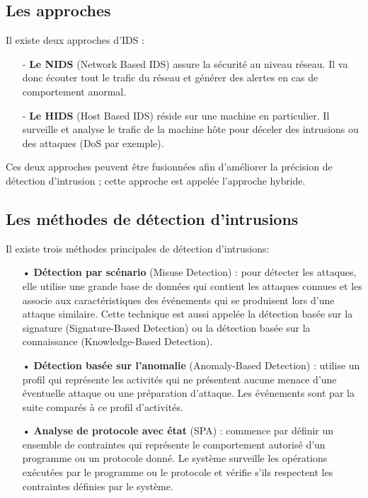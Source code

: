 \subsection{Les approches}
\label{approchesIDS}
Il existe deux approches d’IDS :\\
\begin{itemize}
\item[-]\textbf{Le NIDS} (Network Based IDS) assure la sécurité au niveau réseau. Il va donc écouter tout le trafic du réseau et générer des alertes en cas de comportement anormal.\\
\item[-]\textbf{Le HIDS} (Host Based IDS) réside sur une machine en particulier. Il surveille et analyse le trafic de la machine hôte pour déceler des intrusions ou des attaques (DoS par exemple). \\
\end{itemize}
Ces deux approches peuvent être fusionnées afin d’améliorer la précision de détection d’intrusion ; cette approche est appelée l’approche hybride.

\subsection{Les méthodes de détection d’intrusions} 
Il existe trois méthodes principales de détection d’intrusions:\\
\begin{itemize}
\item[•]\textbf{Détection par scénario} (Misuse Detection) : pour détecter les attaques, elle utilise une grande base de données qui contient les attaques connues et les associe aux caractéristiques des événements qui se produisent lors d’une attaque similaire. Cette technique est aussi appelée la détection basée sur la signature (Signature-Based Detection) ou la détection basée sur la connaissance (Knowledge-Based Detection).\\
\item[•]\textbf{Détection basée sur l’anomalie} (Anomaly-Based Detection) : utilise un profil qui représente les activités qui ne présentent aucune menace d’une éventuelle attaque ou une préparation d’attaque. Les événements sont par la suite comparés à ce profil d’activités.\\
\item[•]\textbf{Analyse de protocole avec état} (SPA) : commence par définir un ensemble de contraintes qui représente le comportement autorisé d’un programme ou un protocole donné. Le système surveille les opérations exécutées par le programme ou le protocole et vérifie s’ils respectent les contraintes définies par le système. 
\end{itemize} 

